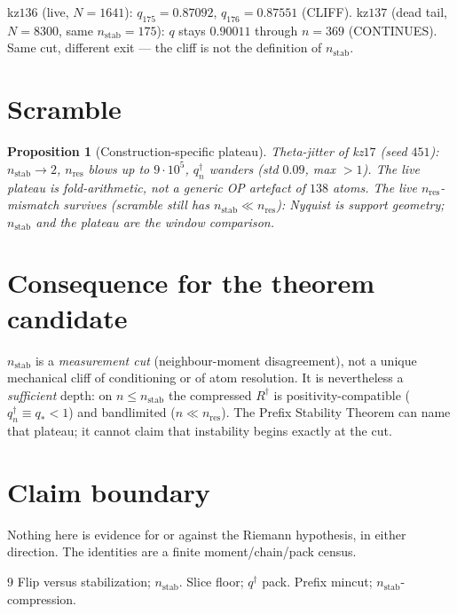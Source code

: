 \documentclass[11pt]{article}
\newtheorem{prop}{Proposition}
\begin{document}
kz$136$ (live, $N=1641$): $q_{175}=0.87092$,
$q_{176}=0.87551$ (CLIFF).
kz$137$ (dead tail, $N=8300$, same
$n_{\mathrm{stab}}=175$): $q$ stays $0.90011$
through $n=369$ (CONTINUES).
Same cut, different exit --- the cliff is not
the definition of $n_{\mathrm{stab}}$.

\section{Scramble}\label{sec:scr}

\begin{prop}[Construction-specific plateau]\label{prop:scr}
Theta-jitter of kz$17$ (seed $451$):
$n_{\mathrm{stab}}\to 2$,
$n_{\mathrm{res}}$ blows up to $9\cdot10^5$,
$q^{\dagger}_n$ wanders (std $0.09$, max $>1$).
The live plateau is fold-arithmetic, not a
generic OP artefact of $138$ atoms.
The live $n_{\mathrm{res}}$-mismatch survives
(scramble still has $n_{\mathrm{stab}}\ll n_{\mathrm{res}}$):
Nyquist is support geometry; $n_{\mathrm{stab}}$
and the plateau are the window comparison.
\end{prop}

\section{Consequence for the theorem candidate}\label{sec:thm}

$n_{\mathrm{stab}}$ is a \emph{measurement cut}
(neighbour-moment disagreement), not a unique
mechanical cliff of conditioning or of atom
resolution.
It is nevertheless a \emph{sufficient} depth:
on $n\le n_{\mathrm{stab}}$ the compressed
$R^{\dagger}$ is positivity-compatible
($q^{\dagger}_n\equiv q_*<1$) and bandlimited
($n\ll n_{\mathrm{res}}$).
The Prefix Stability Theorem can name that
plateau; it cannot claim that instability
begins exactly at the cut.

\section*{Claim boundary}

Nothing here is evidence for or against the
Riemann hypothesis, in either direction.
The identities are a finite moment/chain/pack
census.

\begin{thebibliography}{9}
 Flip versus stabilization; $n_{\mathrm{stab}}$.
 Slice floor; $q^{\dagger}$ pack.
 Prefix mincut; $n_{\mathrm{stab}}$-compression.
\end{thebibliography}
\end{document}
